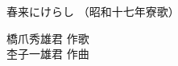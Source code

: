 \documentclass[10pt,b5j]{tarticle} %
\begin{document}
\begin{minipage}[c]{0.7\hsize} %
    \begin{center}
        {\LARGE
            春来にけらし %
        }
        {\small 
            （昭和十七年寮歌） %
        }
    \end{center}
\end{minipage}
\begin{minipage}[c]{0.3\hsize} %
    \begin{flushright} %
        橋爪秀雄君 作歌\\杢子一雄君 作曲 %
    \end{flushright}
\end{minipage}
\end{document}
